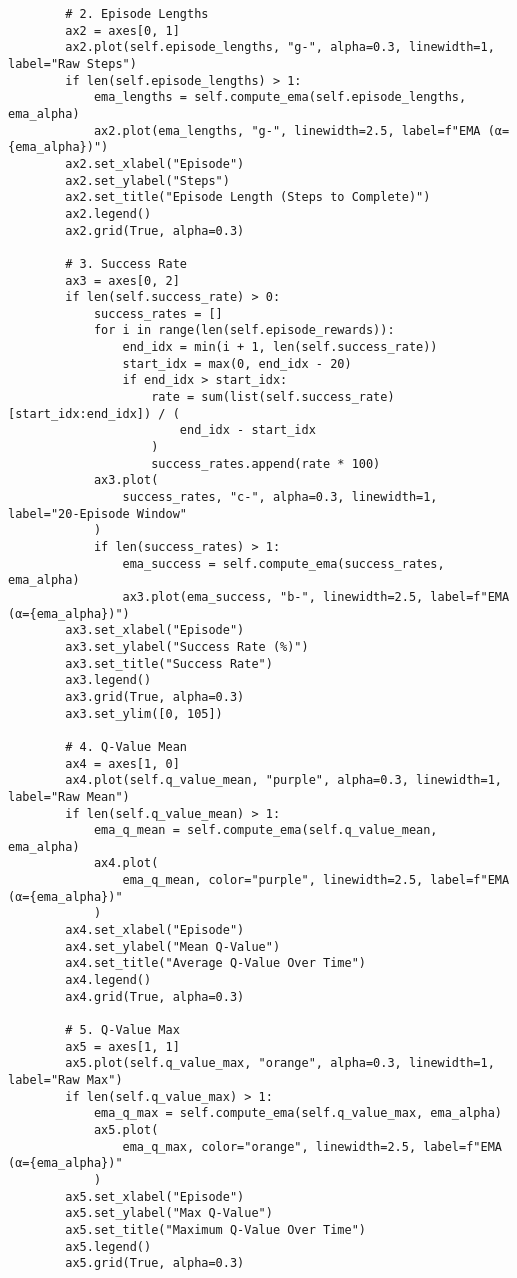 \begin{verbatim}
        # 2. Episode Lengths
        ax2 = axes[0, 1]
        ax2.plot(self.episode_lengths, "g-", alpha=0.3, linewidth=1, label="Raw Steps")
        if len(self.episode_lengths) > 1:
            ema_lengths = self.compute_ema(self.episode_lengths, ema_alpha)
            ax2.plot(ema_lengths, "g-", linewidth=2.5, label=f"EMA (α={ema_alpha})")
        ax2.set_xlabel("Episode")
        ax2.set_ylabel("Steps")
        ax2.set_title("Episode Length (Steps to Complete)")
        ax2.legend()
        ax2.grid(True, alpha=0.3)

        # 3. Success Rate
        ax3 = axes[0, 2]
        if len(self.success_rate) > 0:
            success_rates = []
            for i in range(len(self.episode_rewards)):
                end_idx = min(i + 1, len(self.success_rate))
                start_idx = max(0, end_idx - 20)
                if end_idx > start_idx:
                    rate = sum(list(self.success_rate)[start_idx:end_idx]) / (
                        end_idx - start_idx
                    )
                    success_rates.append(rate * 100)
            ax3.plot(
                success_rates, "c-", alpha=0.3, linewidth=1, label="20-Episode Window"
            )
            if len(success_rates) > 1:
                ema_success = self.compute_ema(success_rates, ema_alpha)
                ax3.plot(ema_success, "b-", linewidth=2.5, label=f"EMA (α={ema_alpha})")
        ax3.set_xlabel("Episode")
        ax3.set_ylabel("Success Rate (%)")
        ax3.set_title("Success Rate")
        ax3.legend()
        ax3.grid(True, alpha=0.3)
        ax3.set_ylim([0, 105])

        # 4. Q-Value Mean
        ax4 = axes[1, 0]
        ax4.plot(self.q_value_mean, "purple", alpha=0.3, linewidth=1, label="Raw Mean")
        if len(self.q_value_mean) > 1:
            ema_q_mean = self.compute_ema(self.q_value_mean, ema_alpha)
            ax4.plot(
                ema_q_mean, color="purple", linewidth=2.5, label=f"EMA (α={ema_alpha})"
            )
        ax4.set_xlabel("Episode")
        ax4.set_ylabel("Mean Q-Value")
        ax4.set_title("Average Q-Value Over Time")
        ax4.legend()
        ax4.grid(True, alpha=0.3)

        # 5. Q-Value Max
        ax5 = axes[1, 1]
        ax5.plot(self.q_value_max, "orange", alpha=0.3, linewidth=1, label="Raw Max")
        if len(self.q_value_max) > 1:
            ema_q_max = self.compute_ema(self.q_value_max, ema_alpha)
            ax5.plot(
                ema_q_max, color="orange", linewidth=2.5, label=f"EMA (α={ema_alpha})"
            )
        ax5.set_xlabel("Episode")
        ax5.set_ylabel("Max Q-Value")
        ax5.set_title("Maximum Q-Value Over Time")
        ax5.legend()
        ax5.grid(True, alpha=0.3)


\end{verbatim}
